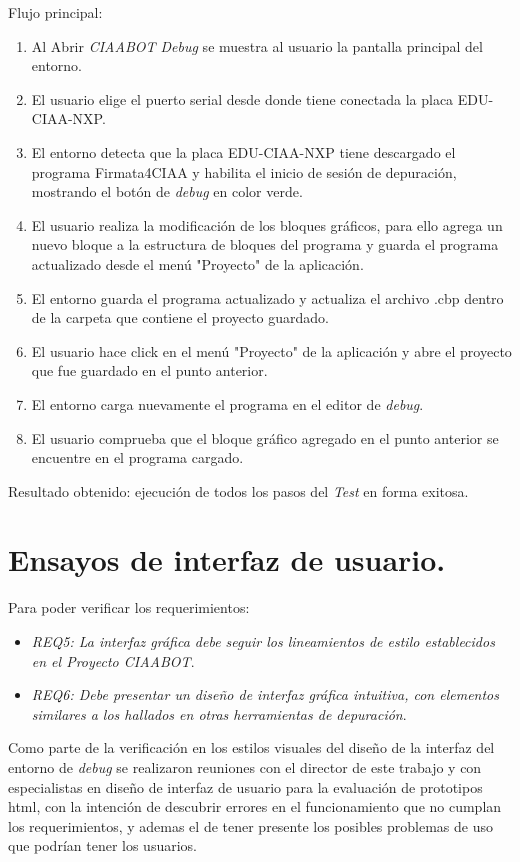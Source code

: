 Flujo principal:
\begin{enumerate}
	\item
	Al Abrir \emph{CIAABOT Debug} se muestra al usuario la pantalla principal del entorno.
	\item
	El usuario elige el puerto serial desde donde tiene conectada la placa EDU-CIAA-NXP.
	\item
	El entorno detecta que la placa EDU-CIAA-NXP tiene descargado el programa Firmata4CIAA y habilita el inicio de sesión de depuración, mostrando el botón de \emph{debug} en color verde.
	\item
	El usuario realiza la modificación de los bloques gráficos, para ello agrega un nuevo bloque a la estructura de bloques del programa y guarda el programa actualizado desde el menú "Proyecto" de la aplicación.
	\item
	El entorno guarda el programa actualizado y actualiza el archivo .cbp dentro de la carpeta que contiene el proyecto guardado.
	\item
	El usuario hace click en el menú "Proyecto" de la aplicación y abre el proyecto que fue guardado en el punto anterior.
	\item
	El entorno carga nuevamente el programa en el editor de \emph{debug}.
	\item
	El usuario comprueba que el bloque gráfico agregado en el punto anterior se encuentre en el programa cargado.
\end{enumerate}

Resultado obtenido: ejecución de todos los pasos del \emph{Test} en forma exitosa.


\section{Ensayos de interfaz de usuario.}
\label{sec:Ensayos de interfaz de usuario.}

Para poder verificar los requerimientos:
\begin{itemize}
	\item \emph{REQ5: La interfaz gráfica debe seguir los lineamientos de estilo establecidos en el Proyecto CIAABOT}.
	\item \emph{REQ6: Debe presentar un diseño de interfaz gráfica intuitiva, con elementos similares a los hallados en otras herramientas de depuración}.
\end{itemize}

Como parte de la verificación en los estilos visuales del diseño de la interfaz del entorno de \emph{debug} se realizaron reuniones con el director de este trabajo y con especialistas en diseño de interfaz de usuario para la evaluación de prototipos html, con la intención de descubrir errores en el funcionamiento que no cumplan los requerimientos, y ademas el de tener presente los posibles problemas de uso que podrían tener los usuarios.


